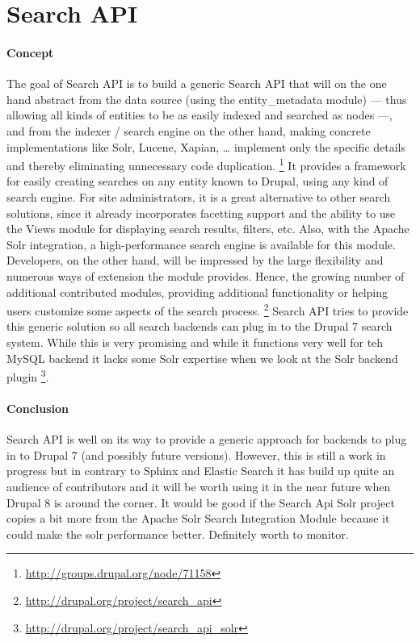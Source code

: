 \section{Search API}
\paragraph{Concept}
The goal of Search API is to build a generic Search API that will on the one hand abstract from the data source (using the entity\_metadata module) — thus allowing all kinds of entities to be as easily indexed and searched as nodes —, and from the indexer / search engine on the other hand, making concrete implementations like Solr, Lucene, Xapian, … implement only the specific details and thereby eliminating unnecessary code duplication. \cite{searchapi} \footnote{\url{http://groups.drupal.org/node/71158}}
It provides a framework for easily creating searches on any entity known to Drupal, using any kind of search engine. For site administrators, it is a great alternative to other search solutions, since it already incorporates facetting support and the ability to use the Views module for displaying search results, filters, etc. Also, with the Apache Solr integration, a high-performance search engine is available for this module.
Developers, on the other hand, will be impressed by the large flexibility and numerous ways of extension the module provides. Hence, the growing number of additional contributed modules, providing additional functionality or helping users customize some aspects of the search process. \footnote{\url{http://drupal.org/project/search_api}}
Search API tries to provide this generic solution so all search backends can plug in to the Drupal 7 search system. While this is very promising and while it functions very well for teh MySQL backend it lacks some Solr expertise when we look at the Solr backend plugin \footnote{\url{http://drupal.org/project/search_api_solr}}.

\paragraph{Conclusion}
Search API is well on its way to provide a generic approach for backends to plug in to Drupal 7 (and possibly future versions). However, this is still a work in progress but in contrary to Sphinx and Elastic Search it has build up quite an audience of contributors and it will be worth using it in the near future when Drupal 8 is around the corner. It would be good if the Search Api Solr project copies a bit more from the Apache Solr Search Integration Module because it could make the solr performance better. Definitely worth to monitor.

